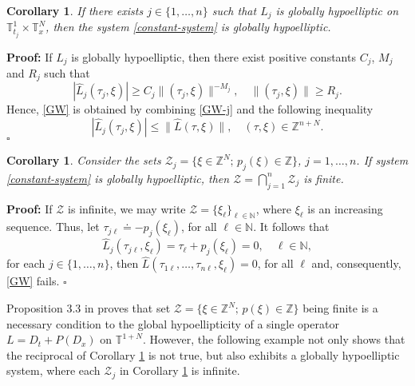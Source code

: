 \documentclass[12pt]{elsarticle}
\newtheorem{corollary}[theorem]{Corollary}
\numberwithin{equation}{section}
\newenvironment{proof}[1][\noindent \textbf{Proof: }]{#1}{ \hfill $\square$ \vspace{2mm}}
\begin{document}
\begin{corollary}\label{coro-const-system}
If there exists $j\in \{1, \ldots, n\}$ such that $L_j$ is globally hypoelliptic on $\mathbb{T}_{t_j}^{1}\times \mathbb{T}_x^N$, then the system \eqref{constant-system} is globally hypoelliptic.	
\end{corollary}


\begin{proof}
If $L_j$ is globally hypoelliptic, then there exist positive constants
$C_j$, $M_j$ and $R_j$ such that 
\begin{equation}\label{GW-j}
|\widehat{L}_j(\tau_j, \xi)| \geq C_j \|(\tau_j, \xi)\|^{-M_j}, \quad 
\|(\tau_j, \xi)\| \geq R_j.
\end{equation}
Hence, \eqref{GW} is obtained by combining  \eqref{GW-j} and the following  inequality
$$
|\widehat{L}_j(\tau_j, \xi)| \leq  \|\widehat{L}(\tau, \xi)\|, \quad (\tau, \xi) \in \mathbb{Z}^{n+N}.
$$
\end{proof}

\begin{corollary}\label{coro-W-finito-const}
Consider the sets $\mathcal{Z}_j = \{ \xi \in \mathbb{Z}^N; \, p_j(\xi) \in \mathbb{Z}\}$, $j=1, \ldots, n$. If  system \eqref{constant-system} is globally hypoelliptic, then $\mathcal{Z} = \bigcap_{j=1}^{n} \mathcal{Z}_j$ is finite. 
\end{corollary}

\begin{proof}
If $\mathcal{Z}$ is  infinite, we may write $\mathcal{Z} = \{\xi_{\ell}\}_{\ell \in \mathbb{N}}$, where $\xi_{\ell}$ is an increasing sequence. Thus, let $\tau_{j\ell} \doteq - p_j(\xi_{\ell})$, for all $\ell \in \mathbb{N}$. It follows that
$$
\widehat{L}_j(\tau_{j\ell}, \xi_{\ell}) = \tau_{\ell} + p_j(\xi_{\ell}) = 0, \quad \ell \in \mathbb{N},
$$
for each  $j \in \{1, \ldots, n\}$, then $\widehat{L}(\tau_{1\ell}, \ldots, \tau_{n\ell}, \xi_{\ell}) = 0$, for all $\ell$ and, consequently, \eqref{GW} fails. 
\end{proof}

Proposition 3.3 in \cite{AGKM} proves that set $\mathcal{Z}=\{ \xi \in \mathbb{Z}^N; \, p(\xi) \in \mathbb{Z}\}$ being finite is a necessary condition to the global hypoellipticity of a single operator $L=D_t+P(D_x)$ on $\mathbb{T}^{1+N}$. However, the following example not only shows that the reciprocal of Corollary \ref{coro-const-system} is not true, but also exhibits a globally hypoelliptic system, where each $\mathcal{Z}_j$ in Corollary \ref{coro-W-finito-const} is infinite. 
\end{document}
